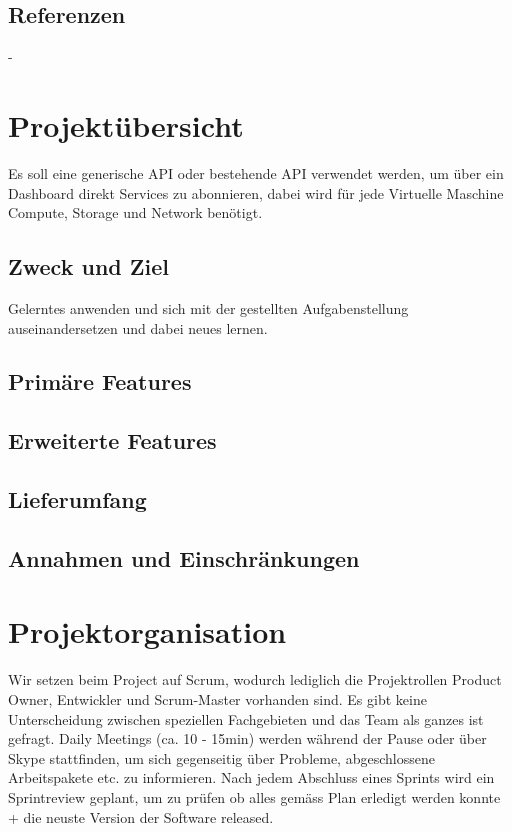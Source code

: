 \documentclass[11pt]{scrartcl}
\begin{document}
\subsection{Referenzen}
-
\section{Projektübersicht}
Es soll eine generische API oder bestehende API verwendet werden, um über ein 
Dashboard direkt Services zu abonnieren, dabei wird für jede Virtuelle Maschine 
Compute, Storage und Network benötigt.

\subsection{Zweck und Ziel}
 Gelerntes anwenden und sich mit der gestellten Aufgabenstellung auseinandersetzen 
 und dabei neues lernen.


\subsection{Primäre Features}

\subsection{Erweiterte Features}

\subsection{Lieferumfang}


\subsection{Annahmen und Einschränkungen}

\section{Projektorganisation}
Wir setzen beim Project auf Scrum, wodurch lediglich die Projektrollen Product 
Owner, Entwickler und Scrum-Master vorhanden sind.
Es gibt keine Unterscheidung zwischen speziellen Fachgebieten und das Team 
als ganzes ist gefragt.
Daily Meetings (ca. 10 - 15min) werden während der Pause oder über Skype stattfinden, um sich 
gegenseitig über Probleme, abgeschlossene Arbeitspakete etc. zu informieren.
Nach jedem Abschluss eines Sprints wird ein Sprintreview geplant, um zu prüfen 
ob alles gemäss Plan erledigt werden konnte + die neuste Version der Software 
released.
\end{document}
